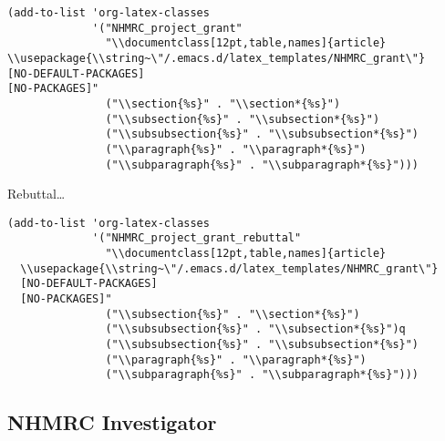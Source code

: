 \documentclass[12pt]{article}
\begin{document}
\begin{verbatim}
(add-to-list 'org-latex-classes
             '("NHMRC_project_grant"
               "\\documentclass[12pt,table,names]{article}
\\usepackage{\\string~\"/.emacs.d/latex_templates/NHMRC_grant\"}
[NO-DEFAULT-PACKAGES]
[NO-PACKAGES]"
               ("\\section{%s}" . "\\section*{%s}")
               ("\\subsection{%s}" . "\\subsection*{%s}")
               ("\\subsubsection{%s}" . "\\subsubsection*{%s}")
               ("\\paragraph{%s}" . "\\paragraph*{%s}")
               ("\\subparagraph{%s}" . "\\subparagraph*{%s}")))
\end{verbatim}
Rebuttal\ldots{} 
\begin{verbatim}
(add-to-list 'org-latex-classes
             '("NHMRC_project_grant_rebuttal"
               "\\documentclass[12pt,table,names]{article}
  \\usepackage{\\string~\"/.emacs.d/latex_templates/NHMRC_grant\"}
  [NO-DEFAULT-PACKAGES]
  [NO-PACKAGES]"
               ("\\subsection{%s}" . "\\section*{%s}")
               ("\\subsubsection{%s}" . "\\subsection*{%s}")q
               ("\\subsubsection{%s}" . "\\subsubsection*{%s}")
               ("\\paragraph{%s}" . "\\paragraph*{%s}")
               ("\\subparagraph{%s}" . "\\subparagraph*{%s}")))

\end{verbatim}

\subsection{NHMRC Investigator}
\label{sec:orgef76cb5}
\end{document}
